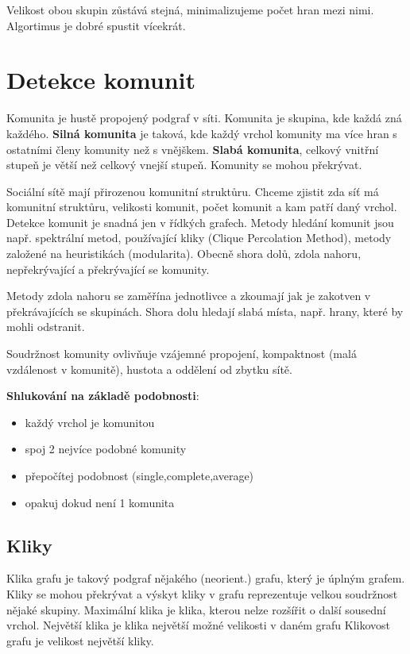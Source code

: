 \documentclass[a4paper,12pt]{article}
\begin{document}
Velikost obou skupin zůstává stejná, minimalizujeme počet hran mezi nimi. Algortimus je dobré spustit vícekrát.

\section{Detekce komunit}
Komunita je hustě propojený podgraf v síti. Komunita je skupina, kde každá zná každého. \textbf{Silná komunita} je taková, kde každý vrchol komunity ma více hran s ostatními
členy komunity než s vnějškem. \textbf{Slabá komunita}, celkový vnitřní stupeň je větší než celkový vnejší stupeň. Komunity se mohou překrývat.


Sociální sítě mají přirozenou komunitní struktůru. Chceme zjistit zda síť má komunitní struktůru, velikosti komunit, počet komunit a kam patří daný vrchol.
Detekce komunit je snadná jen v řídkých grafech. Metody hledání komunit jsou např. spektrální metod, používající kliky (Clique Percolation Method),
metody založené na heuristikách (modularita). Obecně shora dolů, zdola nahoru, nepřekrývající a překrývající se komunity.

Metody zdola nahoru se zaměřína jednotlivce a zkoumají jak je zakotven v překrávajících se skupinách. Shora dolu hledají slabá místa, např. hrany, které by mohli
odstranit.

Soudržnost komunity ovlivňuje vzájemné propojení, kompaktnost (malá vzdálenost v komunitě), hustota a oddělení od zbytku sítě.

\textbf{Shlukování na základě podobnosti}:
\begin{itemize}
    \item každý vrchol je komunitou
    \item spoj 2 nejvíce podobné komunity
    \item přepočítej podobnost (single,complete,average)
    \item opakuj dokud není 1 komunita
\end{itemize}

\subsection{Kliky}
Klika grafu je takový podgraf nějakého (neorient.) grafu, který je úplným grafem. Kliky se mohou překrývat a výskyt kliky v grafu reprezentuje velkou
soudržnost nějaké skupiny. Maximální klika je klika, kterou nelze rozšířit o další sousední vrchol. Největší klika je klika největší možné velikosti v daném grafu
Klikovost grafu je velikost největší kliky.
\end{document}
